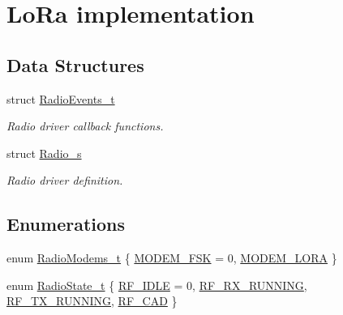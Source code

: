 \hypertarget{group__LORA}{}\section{Lo\+Ra implementation}
\label{group__LORA}
\subsection*{Data Structures}
\begin{DoxyCompactItemize}
\item 
struct \hyperlink{structRadioEvents__t}{Radio\+Events\+\_\+t}
\begin{DoxyCompactList}\small\item\em Radio driver callback functions. \end{DoxyCompactList}\item 
struct \hyperlink{structRadio__s}{Radio\+\_\+s}
\begin{DoxyCompactList}\small\item\em Radio driver definition. \end{DoxyCompactList}\end{DoxyCompactItemize}
\subsection*{Enumerations}
\begin{DoxyCompactItemize}
\item 
enum \hyperlink{group__LORA_ga992ef7a5b7f52975ba7bd8dd97740057}{Radio\+Modems\+\_\+t} \{ \hyperlink{group__LORA_gga992ef7a5b7f52975ba7bd8dd97740057af43891b8bf8129d6ee0bfe83217822a5}{M\+O\+D\+E\+M\+\_\+\+F\+SK} = 0, 
\hyperlink{group__LORA_gga992ef7a5b7f52975ba7bd8dd97740057abeb331e097974ea65b07d74df9e85a8e}{M\+O\+D\+E\+M\+\_\+\+L\+O\+RA}
 \}
\item 
enum \hyperlink{group__LORA_ga2f3fa4ad0237c4ace94aa99086aac9f5}{Radio\+State\+\_\+t} \{ \hyperlink{group__LORA_gga2f3fa4ad0237c4ace94aa99086aac9f5a89c1ff89fc074c1c80f96d186c99f899}{R\+F\+\_\+\+I\+D\+LE} = 0, 
\hyperlink{group__LORA_gga2f3fa4ad0237c4ace94aa99086aac9f5a5a6a549e66aa54871013a612aa2aba45}{R\+F\+\_\+\+R\+X\+\_\+\+R\+U\+N\+N\+I\+NG}, 
\hyperlink{group__LORA_gga2f3fa4ad0237c4ace94aa99086aac9f5add0cb5bc08318df9a5e688f4802ed99d}{R\+F\+\_\+\+T\+X\+\_\+\+R\+U\+N\+N\+I\+NG}, 
\hyperlink{group__LORA_gga2f3fa4ad0237c4ace94aa99086aac9f5a6798b346c6d95e2970d33ccd04c5d39c}{R\+F\+\_\+\+C\+AD}
 \}
\end{DoxyCompactItemize}
